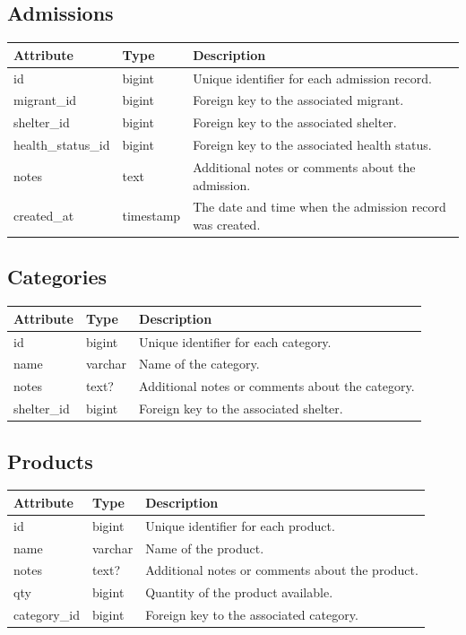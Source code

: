 \documentclass{scrreprt}
\begin{document}
\subsection*{Admissions}
\begin{tabular}{|m{2.5cm}|m{2.5cm}|m{6cm}|}
\hline
\textbf{Attribute} & \textbf{Type} & \textbf{Description} \\
\hline
id & bigint & Unique identifier for each admission record. \\
\hline
migrant\_id & bigint & Foreign key to the associated migrant. \\
\hline
shelter\_id & bigint & Foreign key to the associated shelter. \\
\hline
health\_status\_id & bigint & Foreign key to the associated health status. \\
\hline
notes & text & Additional notes or comments about the admission. \\
\hline
created\_at & timestamp & The date and time when the admission record was created. \\
\hline
\end{tabular}

\subsection*{Categories}
\begin{tabular}{|m{2.5cm}|m{2.5cm}|m{6cm}|}
\hline
\textbf{Attribute} & \textbf{Type} & \textbf{Description} \\
\hline
id & bigint & Unique identifier for each category. \\
\hline
name & varchar & Name of the category. \\
\hline
notes & text? & Additional notes or comments about the category. \\
\hline
shelter\_id & bigint & Foreign key to the associated shelter. \\
\hline
\end{tabular}

\subsection*{Products}
\begin{tabular}{|m{2.5cm}|m{2.5cm}|m{6cm}|}
\hline
\textbf{Attribute} & \textbf{Type} & \textbf{Description} \\
\hline
id & bigint & Unique identifier for each product. \\
\hline
name & varchar & Name of the product. \\
\hline
notes & text? & Additional notes or comments about the product. \\
\hline
qty & bigint & Quantity of the product available. \\
\hline
category\_id & bigint & Foreign key to the associated category. \\
\hline
\end{tabular}
\end{document}
